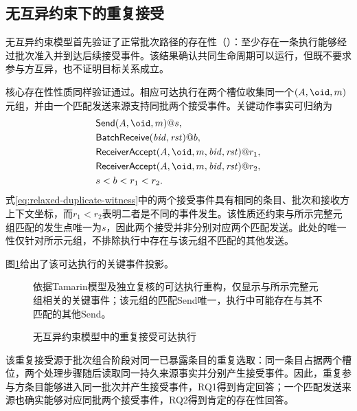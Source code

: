 \subsection{无互异约束下的重复接受}
\label{subsec:relaxed-results}

无互异约束模型首先验证了正常批次路径的存在性（）：至少存在一条执行能够经过批次准入并到达后续接受事件。该结果确认共同生命周期可以运行，但既不要求参与方互异，也不证明目标关系成立。

核心存在性性质同样验证通过。相应可达执行在两个槽位收集同一个$(A,\oid,m)$元组，并由一个匹配发送来源支持同批两个接受事件。关键动作事实可归纳为
\begin{equation}
  \begin{aligned}
    &\mathsf{Send}(A,\oid,m)@s,\\
    &\mathsf{BatchReceive}(\mathit{bid},\mathit{rst})@b,\\
    &\mathsf{ReceiverAccept}(A,\oid,m,\mathit{bid},\mathit{rst})@r_1,\\
    &\mathsf{ReceiverAccept}(A,\oid,m,\mathit{bid},\mathit{rst})@r_2,\\
    &s<b<r_1<r_2.
  \end{aligned}
  \label{eq:relaxed-duplicate-witness}
\end{equation}
式\eqref{eq:relaxed-duplicate-witness}中的两个接受事件具有相同的条目、批次和接收方上下文坐标，而$r_1<r_2$表明二者是不同的事件发生。该性质还约束与所示完整元组匹配的\sendaction 发生点唯一为$s$，因此两个接受并非分别对应两个匹配发送。此处的唯一性仅针对所示元组，不排除执行中存在与该元组不匹配的其他发送。

图\ref{fig:duplicate-acceptance-trace}给出了该可达执行的关键事件投影。
\begin{figure}[tbp]
  \centering
  
  \caption{无互异约束模型中的重复接受可达执行}
  \label{fig:duplicate-acceptance-trace}
  \par\smallskip
  \begin{minipage}{8.2cm}
    \fontsize{7.5}{10}\selectfont
    依据Tamarin模型及独立复核的可达执行重构，仅显示与所示完整元组相关的关键事件；该元组的匹配Send唯一，执行中可能存在与其不匹配的其他Send。
  \end{minipage}
\end{figure}

该重复接受源于批次组合阶段对同一已暴露条目的重复选取：同一条目占据两个槽位，两个处理步骤随后读取同一持久来源事实并分别产生接受事件。因此，重复参与方条目能够进入同一批次并产生接受事件，RQ1得到肯定回答；一个匹配发送来源也确实能够对应同批两个接受事件，RQ2得到肯定的存在性回答。

